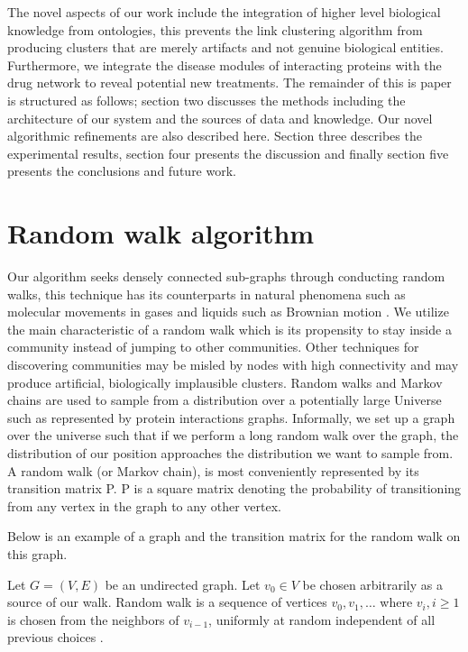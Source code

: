 \documentclass[a4paper,8pt,twocolumn,5p]{elsarticle}
\begin{document}
The novel aspects of our work include the integration of higher level biological knowledge from ontologies, this prevents the link clustering algorithm from producing clusters that are merely artifacts and not genuine biological entities. Furthermore, we  integrate the disease modules of interacting proteins with the drug network to reveal potential new treatments. The remainder of this is paper is structured as follows; section two discusses the methods including the architecture of our system and the sources of data and knowledge. Our novel algorithmic refinements are also described here. Section three describes the experimental  results, section four presents the discussion and finally section five presents the conclusions and future work. 

\section{Random walk algorithm}
Our algorithm seeks densely connected sub-graphs through conducting random walks, this technique has its counterparts in natural phenomena such as molecular movements in gases and liquids such as Brownian motion \cite{Magdziarz2009}. We utilize the main characteristic of a random walk which is its propensity to stay inside a community instead of jumping to other communities. Other techniques for discovering communities may be misled by nodes with high connectivity and may produce artificial, biologically implausible clusters. Random walks and Markov chains are used to sample from a distribution over a potentially large Universe such as  represented by protein interactions graphs. Informally, we set up a graph over the universe such that if we perform a long random walk over the graph, the distribution of our position approaches the distribution we want to sample from. A random walk (or Markov chain), is most conveniently represented by its transition matrix P. P is a square matrix denoting the probability of transitioning from any vertex in the graph to any other vertex.  

Below is an example of a graph and the transition matrix for the random walk on this graph.

Let $G=(V,E)$ be an undirected graph. Let $v_{0} \in V$ be chosen arbitrarily as a source of our walk. Random walk is a sequence of vertices $v_0, v_1, \ldots $ where $v_i, i \geq 1$ is chosen from the neighbors of $v_{i-1}$, uniformly at random independent of all previous choices \cite{Newman2003,Derenyi2005,Blondel2008,Rosvall2008,Hric2014}.
\end{document}
